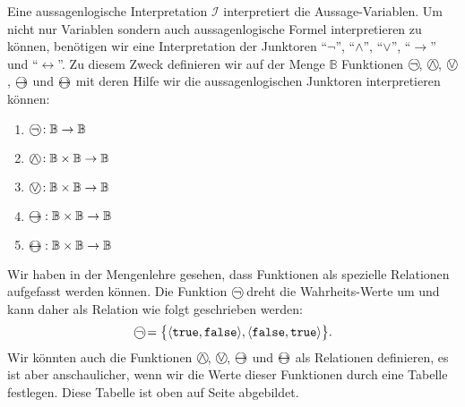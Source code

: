 Eine aussagenlogische Interpretation $\mathcal{I}$ interpretiert die Aussage-Variablen.
Um nicht nur Variablen sondern auch aussagenlogische Formel interpretieren zu k\"{o}nnen, 
ben\"{o}tigen wir eine
Interpretation der Junktoren ``$\neg$'', ``$\wedge$'', ``$\vee$'', ``$\rightarrow$'' und
``$\leftrightarrow$''.  Zu diesem Zweck definieren wir auf der Menge $\mathbb{B}$
Funktionen
$\circneg$, $\circwedge$, $\circvee$, $\circright$ und $\circleftright$
mit deren Hilfe wir die aussagenlogischen Junktoren interpretieren k\"{o}nnen:
\begin{enumerate}
\item $\circneg: \mathbb{B} \rightarrow \mathbb{B}$
\item $\circwedge: \mathbb{B} \times \mathbb{B} \rightarrow \mathbb{B}$
\item $\circvee: \mathbb{B} \times \mathbb{B} \rightarrow \mathbb{B}$
\item $\circright: \mathbb{B} \times \mathbb{B} \rightarrow \mathbb{B}$
\item $\circleftright: \mathbb{B} \times \mathbb{B} \rightarrow \mathbb{B}$
\end{enumerate}
Wir haben in der Mengenlehre gesehen, dass Funktionen als spezielle Relationen
aufgefasst werden k\"{o}nnen.  Die Funktion $\circneg$ dreht die Wahrheits-Werte um und
kann daher als Relation wie folgt geschrieben werden:
\[ \circneg = \bigl\{ \pair(\texttt{true},\texttt{false}), \pair(\texttt{false},\texttt{true}) \bigr\}. \]
Wir k\"{o}nnten auch die Funktionen $\circwedge$, $\circvee$, $\circright$ und $\circleftright$ als
Relationen definieren, es ist aber anschaulicher, wenn wir die Werte dieser
Funktionen durch eine Tabelle festlegen.  Diese Tabelle ist oben auf Seite
\pageref{tab:aussagen-logik} abgebildet. 

